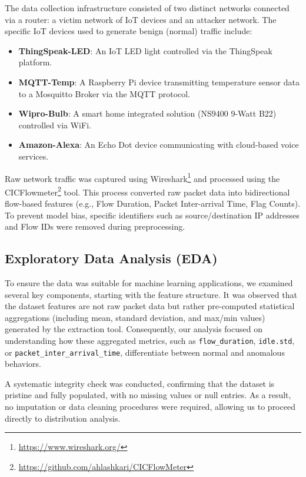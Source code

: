 \documentclass[12pt, a4paper]{article}
\begin{document}
The data collection infrastructure consisted of two distinct networks connected via a router: a victim network of IoT devices and an attacker network. The specific IoT devices used to generate benign (normal) traffic include:

\begin{itemize}
    \item \textbf{ThingSpeak-LED}: An IoT LED light controlled via the ThingSpeak platform.
    \item \textbf{MQTT-Temp}: A Raspberry Pi device transmitting temperature sensor data to a Mosquitto Broker via the MQTT protocol.
    \item \textbf{Wipro-Bulb}: A smart home integrated solution (NS9400 9-Watt B22) controlled via WiFi.
    \item \textbf{Amazon-Alexa}: An Echo Dot device communicating with cloud-based voice services.
\end{itemize}

Raw network traffic was captured using Wireshark\footnote{\url{https://www.wireshark.org/}} and processed using the CICFlowmeter\footnote{\url{https://github.com/ahlashkari/CICFlowMeter}} tool. This process converted raw packet data into bidirectional flow-based features (e.g., Flow Duration, Packet Inter-arrival Time, Flag Counts). To prevent model bias, specific identifiers such as source/destination IP addresses and Flow IDs were removed during preprocessing.

\subsection{Exploratory Data Analysis (EDA)} \label{sec:eda}

To ensure the data was suitable for machine learning applications, we examined several key components, starting with the feature structure. It was observed that the dataset features are not raw packet data but rather pre-computed statistical aggregations (including mean, standard deviation, and max/min values) generated by the extraction tool. Consequently, our analysis focused on understanding how these aggregated metrics, such as \texttt{flow\_duration}, \texttt{idle.std}, or \texttt{packet\_inter\_arrival\_time}, differentiate between normal and anomalous behaviors.

A systematic integrity check was conducted, confirming that the dataset is pristine and fully populated, with no missing values or null entries. As a result, no imputation or data cleaning procedures were required, allowing us to proceed directly to distribution analysis.
\end{document}
